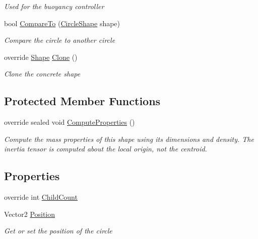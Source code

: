 \begin{DoxyCompactItemize}
\begin{DoxyCompactList}\small\item\em Used for the buoyancy controller \end{DoxyCompactList}\item 
bool \hyperlink{class_farseer_physics_1_1_collision_1_1_shapes_1_1_circle_shape_a4b56d5684f533f16fc68d59e869691a0}{Compare\+To} (\hyperlink{class_farseer_physics_1_1_collision_1_1_shapes_1_1_circle_shape}{Circle\+Shape} shape)
\begin{DoxyCompactList}\small\item\em Compare the circle to another circle \end{DoxyCompactList}\item 
override \hyperlink{class_farseer_physics_1_1_collision_1_1_shapes_1_1_shape}{Shape} \hyperlink{class_farseer_physics_1_1_collision_1_1_shapes_1_1_circle_shape_ad1a8dcb145e7e30bf5fb9db115cb0960}{Clone} ()
\begin{DoxyCompactList}\small\item\em Clone the concrete shape \end{DoxyCompactList}\end{DoxyCompactItemize}
\subsection*{Protected Member Functions}
\begin{DoxyCompactItemize}
\item 
override sealed void \hyperlink{class_farseer_physics_1_1_collision_1_1_shapes_1_1_circle_shape_ae3241dca252a95f80a093dc1c0ea7087}{Compute\+Properties} ()
\begin{DoxyCompactList}\small\item\em Compute the mass properties of this shape using its dimensions and density. The inertia tensor is computed about the local origin, not the centroid. \end{DoxyCompactList}\end{DoxyCompactItemize}
\subsection*{Properties}
\begin{DoxyCompactItemize}
\item 
override int \hyperlink{class_farseer_physics_1_1_collision_1_1_shapes_1_1_circle_shape_abca7822d6342bd26fb2027cca1983700}{Child\+Count}
\item 
Vector2 \hyperlink{class_farseer_physics_1_1_collision_1_1_shapes_1_1_circle_shape_a69baea6b10dd73fed965f11a06965618}{Position}
\begin{DoxyCompactList}\small\item\em Get or set the position of the circle \end{DoxyCompactList}\end{DoxyCompactItemize}
